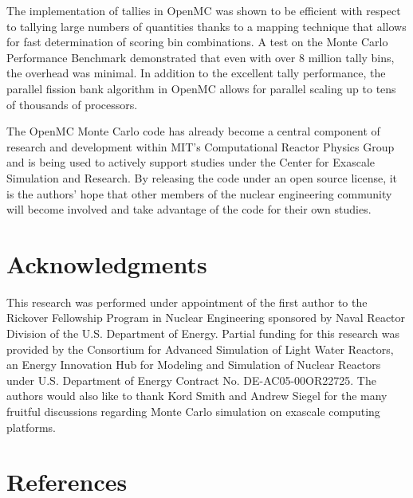 \documentclass[authoryear,preprint]{elsarticle}
\begin{document}
The implementation of tallies in OpenMC was shown to be efficient with respect
to tallying large numbers of quantities thanks to a mapping technique that
allows for fast determination of scoring bin combinations. A test on the Monte
Carlo Performance Benchmark demonstrated that even with over 8 million tally
bins, the overhead was minimal. In addition to the excellent tally performance,
the parallel fission bank algorithm in OpenMC allows for parallel scaling up to
tens of thousands of processors.

The OpenMC Monte Carlo code has already become a central component of research
and development within MIT's Computational Reactor Physics Group and is being
used to actively support studies under the Center for Exascale Simulation and
Research. By releasing the code under an open source license, it is the authors'
hope that other members of the nuclear engineering community will become
involved and take advantage of the code for their own studies.

\section*{Acknowledgments}

This research was performed under appointment of the first author to the
Rickover Fellowship Program in Nuclear Engineering sponsored by Naval Reactor
Division of the U.S. Department of Energy. Partial funding for this research was
provided by the Consortium for Advanced Simulation of Light Water Reactors, an
Energy Innovation Hub for Modeling and Simulation of Nuclear Reactors under
U.S. Department of Energy Contract No. DE-AC05-00OR22725. The authors would also
like to thank Kord Smith and Andrew Siegel for the many fruitful discussions
regarding Monte Carlo simulation on exascale computing platforms.

\section*{References}



\end{document}
